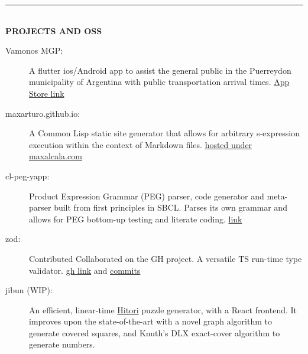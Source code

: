 \documentclass[letterpaper,11pt]{article}
\newcommand{\resheading}[1]{{\large {\textbf{#1 \vphantom{p\^{E}}}}}}
\newcommand{\addline}{\noindent\rule{\textwidth}{2pt}}
\begin{document}
\addline
\\
\resheading{PROJECTS AND OSS}
\begin{description}
  \item [Vamonos MGP:] A flutter ios/Android app to assist the general public in the Puerreydon municipality of Argentina with public transportation arrival times. \href{https://apps.apple.com/us/app/vamonos-mgp/id6447891853}{App Store link}

	\item [maxarturo.github.io:] A Common Lisp static site generator that allows for arbitrary s-expression execution within the context of Markdown files. \href{https://github.com/maxArturo/maxarturo.github.io}{hosted under maxalcala.com}
	
  \item [cl-peg-yapp:] Product Expression Grammar (PEG) parser, code generator and meta-parser built from first principles in SBCL. Parses its own grammar and allows for PEG bottom-up testing and literate coding. \href{https://github.com/maxArturo/cl-peg-yapp}{link}

  \item [zod:] Contributed Collaborated on the GH project. A versatile TS run-time type validator. \href{https://github.com/colinhacks/zod}{gh link} and \href{https://github.com/colinhacks/zod/commits?author=maxArturo}{commits}

	\item [jibun (WIP):] An efficient, linear-time \href{https://en.wikipedia.org/wiki/Hitori}{Hitori} puzzle generator, with a React frontend. It improves upon the state-of-the-art with a novel graph algorithm to generate covered squares, and Knuth's DLX exact-cover algorithm to generate numbers.

\end{description}

\end{document}
